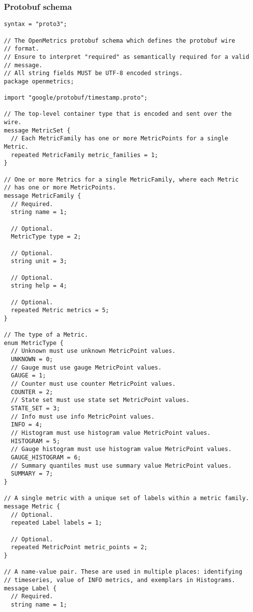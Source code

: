 \documentclass[a4paper,12pt,notitlepage,twoside,openright]{article}
\begin{document}
\hypertarget{protobuf-schema}{%
\subsubsection{Protobuf schema}\label{protobuf-schema}}

\begin{verbatim}
syntax = "proto3";

// The OpenMetrics protobuf schema which defines the protobuf wire
// format.
// Ensure to interpret "required" as semantically required for a valid
// message.
// All string fields MUST be UTF-8 encoded strings.
package openmetrics;

import "google/protobuf/timestamp.proto";

// The top-level container type that is encoded and sent over the wire.
message MetricSet {
  // Each MetricFamily has one or more MetricPoints for a single Metric.
  repeated MetricFamily metric_families = 1;
}

// One or more Metrics for a single MetricFamily, where each Metric
// has one or more MetricPoints.
message MetricFamily {
  // Required.
  string name = 1;

  // Optional.
  MetricType type = 2;

  // Optional.
  string unit = 3;

  // Optional.
  string help = 4;

  // Optional.
  repeated Metric metrics = 5;
}

// The type of a Metric.
enum MetricType {
  // Unknown must use unknown MetricPoint values.
  UNKNOWN = 0;
  // Gauge must use gauge MetricPoint values.
  GAUGE = 1;
  // Counter must use counter MetricPoint values.
  COUNTER = 2;
  // State set must use state set MetricPoint values.
  STATE_SET = 3;
  // Info must use info MetricPoint values.
  INFO = 4;
  // Histogram must use histogram value MetricPoint values.
  HISTOGRAM = 5;
  // Gauge histogram must use histogram value MetricPoint values.
  GAUGE_HISTOGRAM = 6;
  // Summary quantiles must use summary value MetricPoint values.
  SUMMARY = 7;
}

// A single metric with a unique set of labels within a metric family.
message Metric {
  // Optional.
  repeated Label labels = 1;

  // Optional.
  repeated MetricPoint metric_points = 2;
}

// A name-value pair. These are used in multiple places: identifying
// timeseries, value of INFO metrics, and exemplars in Histograms.
message Label {
  // Required.
  string name = 1;


\end{verbatim}
\end{document}
